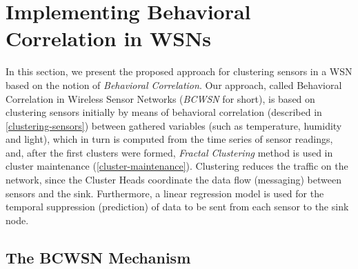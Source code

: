 \documentclass{acm_proc_article-sp}
\begin{document}
\section{Implementing Behavioral Correlation in WSNs}
\label{implementing-bcwsn}

In this section, we present the proposed approach for clustering sensors in a
WSN based on the notion of {\it Behavioral Correlation}. Our approach, called
Behavioral Correlation in Wireless Sensor Networks (\textit{BCWSN} for short),
is based on clustering sensors initially by means of behavioral correlation
(described in \ref{clustering-sensors}) between gathered variables (such as
temperature, humidity and light), which in turn is computed from the time series
of sensor readings, and, after the first clusters were formed, \textit{Fractal
Clustering} method is used in cluster maintenance (\ref{cluster-maintenance}).
Clustering reduces the traffic on the network, since the Cluster Heads
coordinate the data flow (messaging) between sensors and the sink.
Furthermore, a linear regression model is used for the temporal suppression
(prediction) of data to be sent from each sensor to the sink node.


\subsection{The BCWSN Mechanism}
\end{document}
